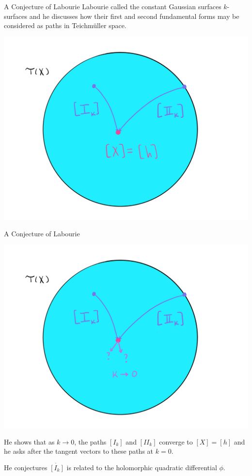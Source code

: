 \documentclass[professionalfont]{beamer}
\newcommand{\two}{I\!I}
\begin{document}


\begin{frame}{A Conjecture of Labourie}
Labourie called the constant Gaussian surfaces $k$-surfaces and he discusses how their first and second fundamental forms may be considered as paths in Teichm\"uller space.

\begin{center}
\includegraphics[scale=0.07]{Teich-paths-1.jpg}
\end{center}


\end{frame}




\begin{frame}{A Conjecture of Labourie}

\vspace{-0.5cm}
\begin{center}
\includegraphics[scale=0.07]{Teich-paths-2.jpg}
\end{center}

\vspace{-0.5cm}
He shows that as $k \to 0$, the paths $[I_k]$ and $[\two_k]$ converge to $[X] = [h]$ and he asks after the tangent vectors to these paths at $k=0$. 
\newline

He conjectures $\dot{[I_k]}$ is related to the holomorphic quadratic differential $\phi$.
\end{frame}
\end{document}

